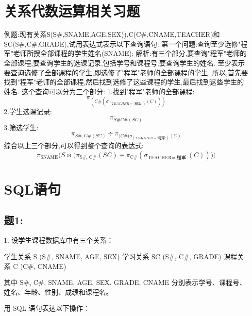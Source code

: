 \documentclass[a4paper,12pt,UTF8,fontset=none]{ctexart}
\begin{document}
\section{关系代数运算相关习题}
例题:现有关系S(S\#,SNAME,AGE,SEX)),C(C\#,CNAME,TEACHER)和SC(S\#,C\#,GRADE),试用表达式表示以下查询语句:
第一个问题:查询至少选修"程军"老师所授全部课程的学生姓名(SNAME);
解析:有三个部分,要查询"程军"老师的全部课程;要查询学生的选课记录,包括学号和课程号;要查询学生的姓名.
至少表示要查询选修了全部课程的学生,即选修了"程军"老师的全部课程的学生.
所以,首先要找到"程军"老师的全部课程,然后找到选修了这些课程的学生,最后找到这些学生的姓名.
这个查询可以分为三个部分:
1.找到"程军"老师的全部课程:\\
\begin{equation}
    \pi_{(C\#(\sigma_(TEACHER='\text{程军}')(C)))}
\end{equation}
2.学生选课记录:\\
\begin{equation}
    \pi_{S\# C\#(SC)}
\end{equation}
3.筛选学生:
\begin{equation}
    {\pi_{S\#,C\#(SC)}}\div{\pi_{(C\#(\sigma_(TEACHER='\text{程军}')(C)}}
\end{equation}
综合以上三个部分,可以得到整个查询的表达式:\\
\begin{equation}
    \pi_{\text{SNAME}} \Big( S \Join \big( \pi_{\text{S\#, C\#}}(SC) \div \pi_{\text{C\#}}( \sigma_{\text{TEACHER='程军'}}(C) ) \big) \Big)
\end{equation}
 
\section{SQL语句}
\subsection{题1:}

1. 设学生课程数据库中有三个关系：

   学生关系 S (S\#, SNAME, AGE, SEX)
    学习关系 SC (S\#, C\#, GRADE)
   课程关系 C (C\#, CNAME)

   其中 S\#, C\#, SNAME, AGE, SEX, GRADE, CNAME 分别表示学号、课程号、姓名、年龄、性别、成绩和课程名。

用 SQL 语句表达以下操作：
\end{document}
